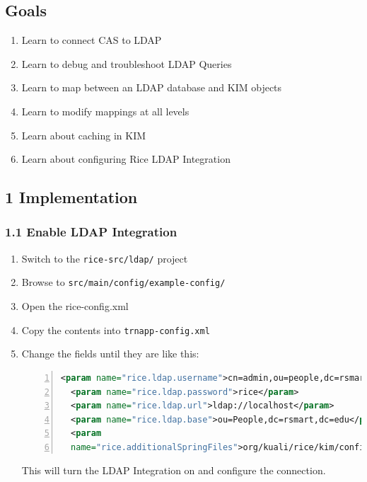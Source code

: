 \subsection*{Goals}
\begin{enumerate}
  \item Learn to connect CAS to LDAP
  \item Learn to debug and troubleshoot LDAP Queries
  \item Learn to map between an LDAP database and KIM objects
  \item Learn to modify mappings at all levels
  \item Learn about caching in KIM
  \item Learn about configuring Rice LDAP Integration
\end{enumerate}

\subsection*{1 Implementation}
\subsubsection*{1.1 Enable LDAP Integration}
\begin{enumerate}
\item Switch to the \verb|rice-src/ldap/| project
\item Browse to \verb|src/main/config/example-config/|
\item Open the rice-config.xml
\item Copy the contents into \verb|trnapp-config.xml|
\item Change the fields until they are like this:
\begin{lstlisting}[numbers=left,language=xml,basicstyle=\scriptsize,backgroundcolor=\color{ubergray},caption={trnapp-config.xml},frame=single,breaklines=true]
  <param name="rice.ldap.username">cn=admin,ou=people,dc=rsmart,dc=com</param>
  <param name="rice.ldap.password">rice</param>
  <param name="rice.ldap.url">ldap://localhost</param>
  <param name="rice.ldap.base">ou=People,dc=rsmart,dc=edu</param>
  <param
  name="rice.additionalSpringFiles">org/kuali/rice/kim/config/KIMLdapSpringBeans.xml</param>
\end{lstlisting}
This will turn the LDAP Integration on and configure the connection.
\end{enumerate}

